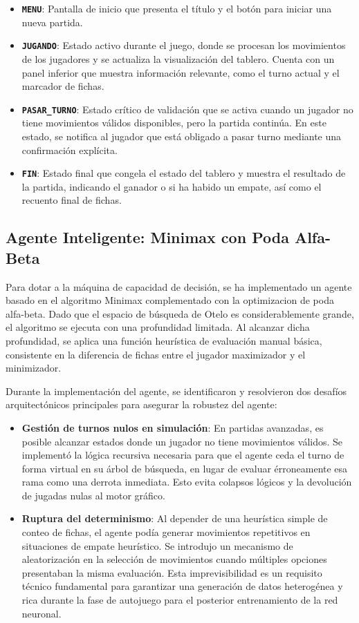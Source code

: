 \documentclass[conference]{IEEEtran}
\begin{document}
\begin{itemize}
    \item \textbf{\texttt{MENU}}: Pantalla de inicio que presenta el título y el botón para iniciar una nueva partida.
    \item \textbf{\texttt{JUGANDO}}: Estado activo durante el juego, donde se procesan los movimientos de los jugadores y se actualiza la visualización del tablero. Cuenta con un panel 
    inferior que muestra información relevante, como el turno actual y el marcador de fichas.
    \item \textbf{\texttt{PASAR\_TURNO}}: Estado crítico de validación que se activa cuando un jugador no tiene movimientos válidos disponibles, pero la partida continúa. En este estado,
    se notifica al jugador que está obligado a pasar turno mediante una confirmación explícita.
    \item \textbf{\texttt{FIN}}: Estado final que congela el estado del tablero y muestra el resultado de la partida, indicando el ganador o si ha habido un empate, así como el recuento final de fichas. 
\end{itemize}

\subsection{Agente Inteligente: Minimax con Poda Alfa-Beta}
Para dotar a la máquina de capacidad de decisión, se ha implementado un agente basado en el algoritmo Minimax complementado con la optimizacion de poda alfa-beta. 
Dado que el espacio de búsqueda de Otelo es considerablemente grande, el algoritmo se ejecuta con una profundidad limitada. Al alcanzar dicha profundidad, se aplica una función heurística
de evaluación manual básica, consistente en la diferencia de fichas entre el jugador maximizador y el minimizador. 

Durante la implementación del agente, se identificaron y resolvieron dos desafíos arquitectónicos principales para asegurar la robustez del agente:
\begin{itemize}
    \item \textbf{Gestión de turnos nulos en simulación}: En partidas avanzadas, es posible alcanzar estados donde un jugador no tiene movimientos válidos. Se implementó la lógica
    recursiva necesaria para que el agente ceda el turno de forma virtual en su árbol de búsqueda, en lugar de evaluar érroneamente esa rama como una derrota inmediata. Esto evita colapsos lógicos y la devolución de jugadas nulas al motor gráfico.
    \item \textbf{Ruptura del determinismo}: Al depender de una heurística simple de conteo de fichas, el agente podía generar movimientos repetitivos en situaciones de empate heurístico. 
    Se introdujo un mecanismo de aleatorización en la selección de movimientos cuando múltiples opciones presentaban la misma evaluación. Esta imprevisibilidad es un requisito técnico fundamental para garantizar una generación de datos heterogénea y rica durante la fase de autojuego para el posterior entrenamiento de la red neuronal.
\end{itemize}
\end{document}
